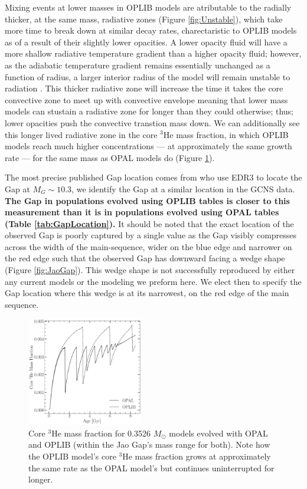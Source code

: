 Mixing events at lower masses in OPLIB models are atributable to the radially
thicker, at the same mass, radiative zones (Figure \ref{fig:Unstable}), which
take more time to break down at similar decay rates, charectaristic to OPLIB
models as of a result of their slightly lower opacities. A lower opacity fluid
will have a more shallow radiative temperature gradient than a higher opacity
fluid; however, as the adiabatic temperature gradient remains essentially
unchanged as a function of radius, a larger interior radius of the model will
remain unstable to radiation . This thicker radiative zone will increase the
time it takes the core convective zone to meet up with convective envelope
meaning that lower mass models can stustain a radiative zone for longer than
they could otherwise; thus; lower opacities push the convective transtion mass
down. We can additionally see this longer lived radiative zone in the core
$^{3}$He mass fraction, in which OPLIB models reach much higher concentrations
--- at approximately the same growth rate --- for the same mass as OPAL models
do (Figure \ref{fig:OPALOPLIB3He}). 

The most precise published Gap location comes from \citet{Jao2020} who use EDR3
to locate the Gap at $M_{G} \sim 10.3$, we identify the Gap at a similar
location in the GCNS data. \textbf{The Gap in populations evolved using OPLIB
tables is closer to this measurement than it is in populations evolved using
OPAL tables (Table \ref{tab:GapLocation}).} It should be noted that the exact
location of the observed Gap is poorly captured by a single value as the Gap
visibly compresses across the width of the main-sequence, wider on the blue
edge and narrower on the red edge such that the observed Gap has downward
facing a wedge shape (Figure \ref{fig:JaoGap}). This wedge shape is not
successfully reproduced by either any current models or the modeling we preform
here. We elect then to specify the Gap location where this wedge is at its
narrowest, on the red edge of the main sequence.

\begin{figure}
	\centering
	\includegraphics[width=0.45\textwidth]{Core3HECompSameMass.pdf}
	\caption{Core $^{3}$He mass fraction for  0.3526 $M_{\odot}$ models evolved
	with OPAL and OPLIB (within the Jao Gap's mass range for both). Note how
	the OPLIB model's core $^{3}$He mass fraction grows at approximately the
	same rate as the OPAL model's but continues uninterrupted for longer.}
	\label{fig:OPALOPLIB3He}
\end{figure}

